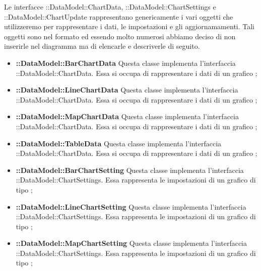 	Le interfacce ::DataModel::ChartData, ::DataModel::ChartSettings e ::DataModel::ChartUpdate rappresentano genericamente i vari oggetti che utilizzeremo per rappresentare i dati, le impostazioni e gli aggiornamamenti. Tali oggetti sono nel formato  ed essendo molto numerosi abbiamo deciso di non inserirle nel diagramma ma di elencarle e descriverle di seguito.

	\begin{itemize}
		\item \textbf{::DataModel::BarChartData} Questa classe implementa l'interfaccia ::DataModel::ChartData. Essa si occupa di rappresentare i dati di un grafico ;

		\item \textbf{::DataModel::LineChartData} Questa classe implementa l'interfaccia ::DataModel::ChartData. Essa si occupa di rappresentare i dati di un grafico ;

		\item \textbf{::DataModel::MapChartData} Questa classe implementa l'interfaccia ::DataModel::ChartData. Essa si occupa di rappresentare i dati di un grafico ;

		\item \textbf{::DataModel::TableData} Questa classe implementa l'interfaccia \linebreak {}::DataModel::ChartData. Essa si occupa di rappresentare i dati di un grafico ;

		\item \textbf{::DataModel::BarChartSetting} Questa classe implementa l'interfaccia ::DataModel::ChartSettings. Essa rappresenta le impostazioni di un grafico di tipo ;

		\item \textbf{::DataModel::LineChartSetting} Questa classe implementa l'interfaccia ::DataModel::ChartSettings. Essa rappresenta le impostazioni di un grafico di tipo ;

		\item \textbf{::DataModel::MapChartSetting} Questa classe implementa l'interfaccia ::DataModel::ChartSettings. Essa rappresenta le impostazioni di un grafico di tipo ;


\end{itemize}
